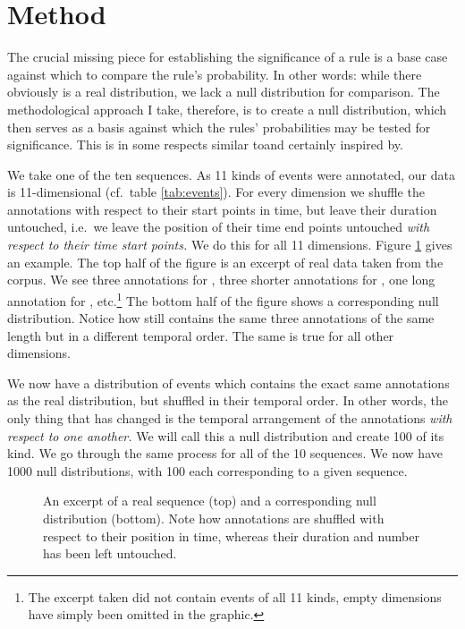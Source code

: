 \section{Method}
\label{sec:significancemethod}
The crucial missing piece for establishing the significance of a rule is a base case against which to compare the rule's probability. In other words: while there obviously is a real distribution, we lack a null distribution for comparison. The methodological approach I take, therefore, is to create a null distribution, which then serves as a basis against which the rules' probabilities may be tested for significance. This is in some respects similar to\dash and certainly inspired by\dash \citet[]{abuzhaya17}.

We take one of the ten sequences. As 11 kinds of events were annotated, our data is 11-dimensional (cf.~table \ref{tab:events}). For every dimension we shuffle the annotations with respect to their start points in time, but leave their duration untouched, i.e.~we leave the position of their time end points untouched \emph{with respect to their time start points.} We do this for all 11 dimensions. Figure \ref{fig:null} gives an example. The top half of the figure is an excerpt of real data taken from the corpus. We see three annotations for , three shorter annotations for , one long annotation for , etc.\footnote{The excerpt taken did not contain events of all 11 kinds, empty dimensions have simply been omitted in the graphic.} The bottom half of the figure shows a corresponding null distribution. Notice how  still contains the same three annotations of the same length but in a different temporal order. The same is true for all other dimensions.

We now have a distribution of events which contains the exact same annotations as the real distribution, but shuffled in their temporal order. In other words, the only thing that has changed is the temporal arrangement of the annotations \emph{with respect to one another.} We will call this a null distribution and create 100 of its kind. %
We go through the same process for all of the 10 sequences. %
We now have 1000 null distributions, with 100 each corresponding to a given sequence.

\begin{figure}
	\centering
	
	\caption{An excerpt of a real sequence (top) and a corresponding null distribution (bottom). Note how annotations are shuffled with respect to their position in time, whereas their duration and number has been left untouched.}
	\label{fig:null}
\end{figure}

